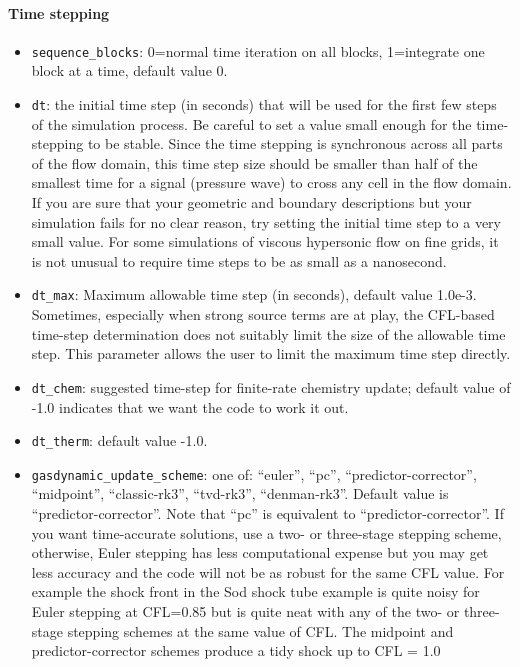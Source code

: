 \paragraph{Time stepping}
\begin{itemize}
\item \texttt{sequence\_blocks}: 0=normal time iteration on all blocks, 1=integrate one block
  at a time, default value 0.
\item \texttt{dt}\ddag: the initial time step (in seconds) that will be used for the
  first few steps of the simulation process.
  Be careful to set a value small enough for the time-stepping to be stable.
  Since the time stepping is synchronous across all parts of the flow domain,
  this time step size should be smaller than half of the smallest time for a signal
  (pressure wave) to cross any cell in the flow domain. 
  If you are sure that your geometric and boundary descriptions but your simulation
  fails for no clear reason, try setting the initial time step to a very small value.
  For some simulations of viscous hypersonic flow on fine grids, 
  it is not unusual to require time steps to be as small as a nanosecond.
\item \texttt{dt\_max}\ddag: Maximum allowable time step (in seconds),
 default value 1.0e-3.
 Sometimes, especially when strong source terms are at play, the CFL-based time-step 
 determination does not suitably limit the size of the allowable time step.
 This parameter allows the user to limit the maximum time step directly.
\item \texttt{dt\_chem}: suggested time-step for finite-rate chemistry update;
  default value of -1.0 indicates that we want the code to work it out.
\item \texttt{dt\_therm}: default value -1.0.
\item \texttt{gasdynamic\_update\_scheme}\ddag: one of: ``euler'', ``pc'', ``predictor-corrector'',
  ``midpoint'', ``classic-rk3'', ``tvd-rk3'', ``denman-rk3''.
  Default value is ``predictor-corrector''.
  Note that ``pc'' is equivalent to ``predictor-corrector''.
  If you want time-accurate solutions, use a two- or three-stage stepping scheme,
  otherwise, Euler stepping has less computational expense 
  but you may get less accuracy and the code will not be as robust for the same CFL value.
  For example the shock front in the Sod shock tube example is quite noisy for Euler
  stepping at CFL=0.85 but is quite neat with any of the two- or three-stage stepping schemes
  at the same value of CFL.  
  The midpoint and predictor-corrector schemes produce a tidy shock up to CFL = 1.0

\end{itemize}
